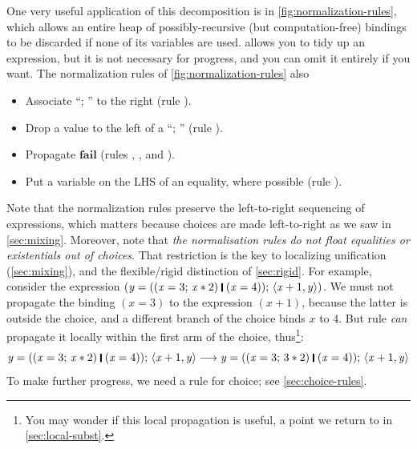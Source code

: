 \documentclass[acmsmall,review,anonymous,dvipsnames]{acmart}
\newcommand{\Varid}[1]{\mathit{#1}}
\begin{document}
One very useful application of this decomposition is  in \cref{fig:normalization-rules},
which allows an entire heap of possibly-recursive (but computation-free)
bindings to be discarded if none of its variables are used.
 allows you to tidy up an expression, but it is not necessary for progress,
and you can omit it entirely if you want.
The normalization rules of \cref{fig:normalization-rules} also
\begin{itemize}
  \item Associate ``\ensuremath{;\,}'' to the right (rule ).
  \item Drop a value to the left of a ``\ensuremath{;\,}'' (rule ).
  \item Propagate \ensuremath{\textbf{fail}} (rules , , and ).
  \item Put a variable on the LHS of an equality, where possible (rule ).
\end{itemize}
Note that the normalization rules preserve the left-to-right sequencing of expressions,
which matters because choices are made left-to-right as we saw in \cref{sec:mixing}.
Moreover, note that \emph{the normalisation rules do not float equalities or existentials out of choices}.
That restriction is the key to localizing unification (\cref{sec:mixing}), and
the flexible/rigid distinction of
\cref{sec:rigid}. For example, consider the expression
\ensuremath{(\Varid{y}\mathrel{=}((\Varid{x}\mathrel{=}\mathrm{3};\,\Varid{x}\mathbin{*}\mathrm{2})\;\rule[-0.3mm]{0.5mm}{2.5mm}\;(\Varid{x}\mathrel{=}\mathrm{4}));\,\langle{}\Varid{x}\mathbin{+}\mathrm{1},\Varid{y}\rangle)}.
We must not propagate the binding \ensuremath{(\Varid{x}\mathrel{=}\mathrm{3})} to the expression \ensuremath{(\Varid{x}\mathbin{+}\mathrm{1})},
because the latter is outside the choice, and a different branch of the choice binds \ensuremath{\Varid{x}} to \ensuremath{\mathrm{4}}.
But rule 
\emph{can} propagate it locally
within the first arm of the choice, thus\footnote{
You may wonder if this local propagation is useful, a point we return
to in \cref{sec:local-subst}.}:
$$
\ensuremath{\Varid{y}\mathrel{=}((\Varid{x}\mathrel{=}\mathrm{3};\,\Varid{x}\mathbin{*}\mathrm{2})\;\rule[-0.3mm]{0.5mm}{2.5mm}\;(\Varid{x}\mathrel{=}\mathrm{4}));\,\langle{}\Varid{x}\mathbin{+}\mathrm{1},\Varid{y}\rangle}
\movesto
\ensuremath{\Varid{y}\mathrel{=}((\Varid{x}\mathrel{=}\mathrm{3};\,\mathrm{3}\mathbin{*}\mathrm{2})\;\rule[-0.3mm]{0.5mm}{2.5mm}\;(\Varid{x}\mathrel{=}\mathrm{4}));\,\langle{}\Varid{x}\mathbin{+}\mathrm{1},\Varid{y}\rangle}
$$
To make further progress, we need a rule for choice; see \cref{sec:choice-rules}.
\end{document}
